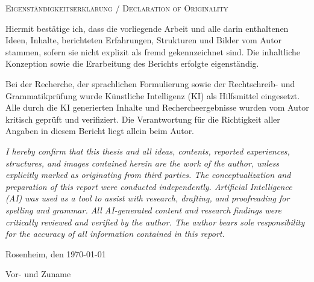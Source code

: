 \cleardoubleemptypage

{
    \large
    \thispagestyle{empty}
    \vspace*{\fill}

    \noindent
    \textsc{Eigenständigkeitserklärung / Declaration of Originality}

    \medskip

    \noindent
    Hiermit bestätige ich, dass die vorliegende Arbeit und alle darin enthaltenen Ideen, Inhalte, berichteten Erfahrungen, Strukturen und Bilder vom Autor stammen, sofern sie nicht explizit als fremd gekennzeichnet sind. Die inhaltliche Konzeption sowie die Erarbeitung des Berichts erfolgte eigenständig.

    Bei der Recherche, der sprachlichen Formulierung sowie der Rechtschreib- und Grammatikprüfung wurde Künstliche Intelligenz (KI) als Hilfsmittel eingesetzt. Alle durch die KI generierten Inhalte und Rechercheergebnisse wurden vom Autor kritisch geprüft und verifiziert. Die Verantwortung für die Richtigkeit aller Angaben in diesem Bericht liegt allein beim Autor.

    \medskip

    \textit{I hereby confirm that this thesis and all ideas, contents, reported experiences, structures, and images contained herein are the work of the author, unless explicitly marked as originating from third parties. The conceptualization and preparation of this report were conducted independently. Artificial Intelligence (AI) was used as a tool to assist with research, drafting, and proofreading for spelling and grammar. All AI-generated content and research findings were critically reviewed and verified by the author. The author bears sole responsibility for the accuracy of all information contained in this report.}

    \bigskip

    \noindent
    Rosenheim, den \today

    \vspace*{2cm}

    \noindent
    Vor- und Zuname
}

